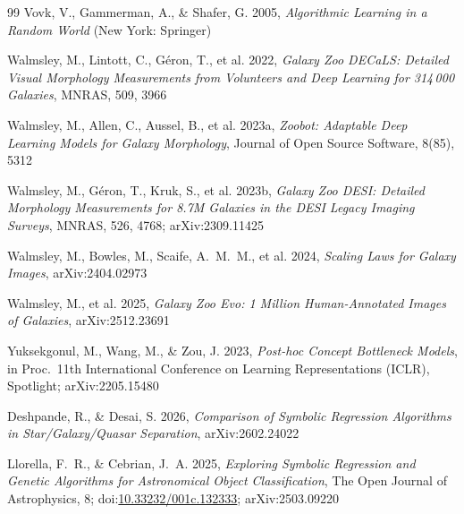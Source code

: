 \documentclass[11pt]{article}
\providecommand{\doi}[1]{doi:\href{https://doi.org/#1}{#1}}
\providecommand{\mnras}{MNRAS}
\begin{document}
\begin{thebibliography}{99}
Vovk, V., Gammerman, A., \& Shafer, G. 2005, \emph{Algorithmic Learning in a
Random World} (New York: Springer)

Walmsley, M., Lintott, C., Géron, T., et al. 2022, \emph{Galaxy Zoo DECaLS:
Detailed Visual Morphology Measurements from Volunteers and Deep Learning for
314\,000 Galaxies}, \mnras, 509, 3966

Walmsley, M., Allen, C., Aussel, B., et al. 2023a, \emph{Zoobot: Adaptable
Deep Learning Models for Galaxy Morphology}, Journal of Open Source Software,
8(85), 5312

Walmsley, M., Géron, T., Kruk, S., et al. 2023b, \emph{Galaxy Zoo DESI:
Detailed Morphology Measurements for 8.7M Galaxies in the DESI Legacy Imaging
Surveys}, \mnras, 526, 4768; arXiv:2309.11425

Walmsley, M., Bowles, M., Scaife, A.~M.~M., et al. 2024, \emph{Scaling Laws
for Galaxy Images}, arXiv:2404.02973

Walmsley, M., et al. 2025, \emph{Galaxy Zoo Evo: 1 Million Human-Annotated
Images of Galaxies}, arXiv:2512.23691

Yuksekgonul, M., Wang, M., \& Zou, J. 2023, \emph{Post-hoc Concept Bottleneck
Models}, in Proc.\ 11th International Conference on Learning Representations
(ICLR), Spotlight; arXiv:2205.15480

Deshpande, R., \& Desai, S. 2026, \emph{Comparison of Symbolic Regression
Algorithms in Star/Galaxy/Quasar Separation}, arXiv:2602.24022

Llorella, F.~R., \& Cebrian, J.~A. 2025, \emph{Exploring Symbolic Regression
and Genetic Algorithms for Astronomical Object Classification}, The Open
Journal of Astrophysics, 8; \doi{10.33232/001c.132333}; arXiv:2503.09220

\end{thebibliography}
\end{document}
